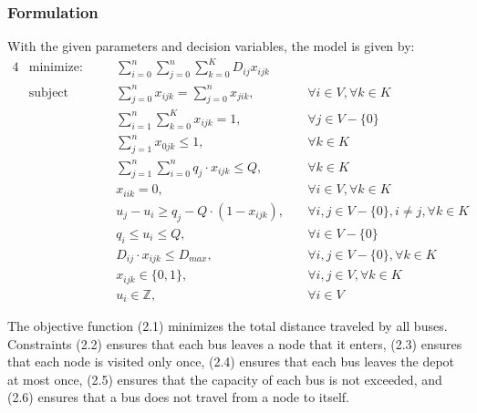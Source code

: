 \documentclass[12pt]{article}
\begin{document}
\subsubsection{Formulation}
With the given parameters and decision variables, the model is given by:
\begin{alignat}{4}
     & \text{minimize:}   &       & \sum_{i=0}^{n} \sum_{j=0}^{n} \sum_{k=0}^{K} D_{ij} x_{ijk}                                                              \\
     & \text{subject to:} & \quad & \sum_{j=0}^{n} x_{ijk} = \sum_{j=0}^{n} x_{jik},            & \quad \forall i \in V, \forall k \in K                     \\
     &                    & \quad & \sum_{i=1}^{n} \sum_{k=0}^K x_{ijk} = 1,                    & \quad \forall j \in V - \{0\}                              \\
     &                    & \quad & \sum_{j=1}^{n} x_{0jk} \leq 1,                              & \quad \forall k \in K                                      \\
     &                    & \quad & \sum_{j=1}^{n} \sum_{i=0}^{n} q_j \cdot x_{ijk} \leq Q,     & \quad \forall k \in K                                      \\
     &                    & \quad & x_{iik} = 0,                                                & \quad \forall i \in V, \forall k \in K                     \\
     &                    & \quad & u_j - u_i \geq q_j - Q \cdot (1 - x_{ijk}),                 & \quad \forall i,j \in V - \{0\}, i \neq j, \forall k \in K \\
     &                    & \quad & q_i \leq u_i \leq Q,                                        & \quad \forall i \in V - \{0\}                              \\
     &                    & \quad & D_{ij} \cdot x_{ijk} \leq D_{max},                          & \quad \forall i,j \in V - \{0\}, \forall k \in K           \\
     &                    & \quad & x_{ijk} \in \{0,1\},                                        & \quad \forall i,j \in V, \forall k \in K                   \\
     &                    & \quad & u_i \in \mathbb{Z},                                         & \quad \forall i \in V
\end{alignat}

The objective function (2.1) minimizes the total distance traveled by all buses. Constraints (2.2) ensures that each bus leaves a node that it enters,
(2.3) ensures that each node is visited only once,
(2.4) ensures that each bus leaves the depot at most once,
(2.5) ensures that the capacity of each bus is not exceeded,
and (2.6) ensures that a bus does not travel from a node to itself.
\end{document}
